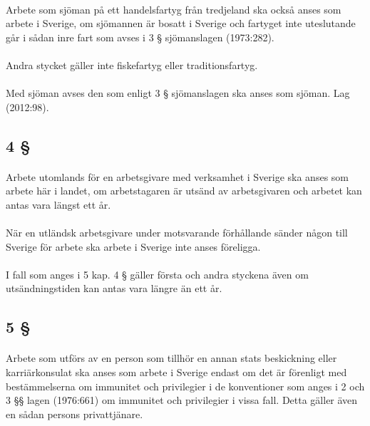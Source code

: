 \documentclass[a4paper,notitlepage,openany,10pt]{book}
\begin{document}
\paragraph*{}
Arbete som sjöman på ett handelsfartyg från tredjeland ska också anses som arbete i Sverige, om sjömannen är bosatt i Sverige och fartyget inte uteslutande går i sådan inre fart som avses i 3 § sjömanslagen (1973:282).
\paragraph*{}
Andra stycket gäller inte fiskefartyg eller traditionsfartyg.
\paragraph*{}
Med sjöman avses den som enligt 3 § sjömanslagen ska anses som sjöman.
Lag (2012:98).
\subsection*{4 §}
\paragraph*{}
Arbete utomlands för en arbetsgivare med verksamhet i Sverige ska anses som arbete här i landet, om arbetstagaren är utsänd av arbetsgivaren och arbetet kan antas vara längst ett år.
\paragraph*{}
När en utländsk arbetsgivare under motsvarande förhållande sänder någon till Sverige för arbete ska arbete i Sverige inte anses föreligga.
\paragraph*{}
I fall som anges i 5 kap. 4 § gäller första och andra styckena även om utsändningstiden kan antas vara längre än ett år.
\subsection*{5 §}
\paragraph*{}
Arbete som utförs av en person som tillhör en annan stats beskickning eller karriärkonsulat ska anses som arbete i Sverige endast om det är förenligt med bestämmelserna om immunitet och privilegier i de konventioner som anges i 2 och 3 §§ lagen (1976:661) om immunitet och privilegier i vissa fall. Detta gäller även en sådan persons privattjänare.
\end{document}
